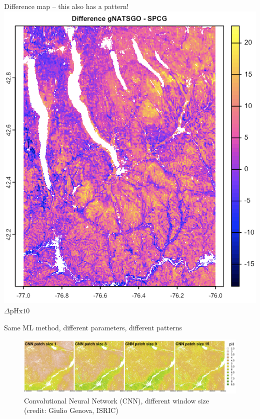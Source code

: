 \documentclass[aspectratio=169]{beamer}
\begin{document}
\newpage
\begin{frame}{Difference map -- this also has a pattern!}
        \centering        \includegraphics[height=0.75\textheight]  {graphics_david/Delta_gNATSGO_SG_ph05.png}
\\
$\Delta \mathrm{pH x 10}$
\end{frame}


\begin{frame}{Same ML method, different parameters, different patterns}
    \begin{figure}
        \centering
        \includegraphics[width=\textwidth]{./graphics_david/GenovaPosterFig1a.png}
        \\{Convolutional Neural Network (CNN), different window size\\(credit: Giulio Genova, ISRIC)}
    \end{figure}
\end{frame}
\end{document}
